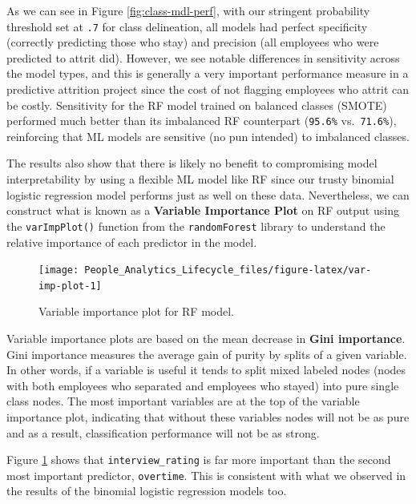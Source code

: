 \documentclass[
]{book}
\begin{document}
As we can see in Figure \ref{fig:class-mdl-perf}, with our stringent probability threshold set at \texttt{.7} for class delineation, all models had perfect specificity (correctly predicting those who stay) and precision (all employees who were predicted to attrit did). However, we see notable differences in sensitivity across the model types, and this is generally a very important performance measure in a predictive attrition project since the cost of not flagging employees who attrit can be costly. Sensitivity for the RF model trained on balanced classes (SMOTE) performed much better than its imbalanced RF counterpart (\texttt{95.6\%} vs.~\texttt{71.6\%}), reinforcing that ML models are sensitive (no pun intended) to imbalanced classes.

The results also show that there is likely no benefit to compromising model interpretability by using a flexible ML model like RF since our trusty binomial logistic regression model performs just as well on these data. Nevertheless, we can construct what is known as a \textbf{Variable Importance Plot} on RF output using the \texttt{varImpPlot()} function from the \texttt{randomForest} library to understand the relative importance of each predictor in the model.

\begin{figure}

{\centering \texttt{[image: People\_Analytics\_Lifecycle\_files/figure-latex/var-imp-plot-1]} 

}

\caption{Variable importance plot for RF model.}\label{fig:var-imp-plot}
\end{figure}

Variable importance plots are based on the mean decrease in \textbf{Gini importance}. Gini importance measures the average gain of purity by splits of a given variable. In other words, if a variable is useful it tends to split mixed labeled nodes (nodes with both employees who separated and employees who stayed) into pure single class nodes. The most important variables are at the top of the variable importance plot, indicating that without these variables nodes will not be as pure and as a result, classification performance will not be as strong.

Figure \ref{fig:var-imp-plot} shows that \texttt{interview\_rating} is far more important than the second most important predictor, \texttt{overtime}. This is consistent with what we observed in the results of the binomial logistic regression models too.
\end{document}

